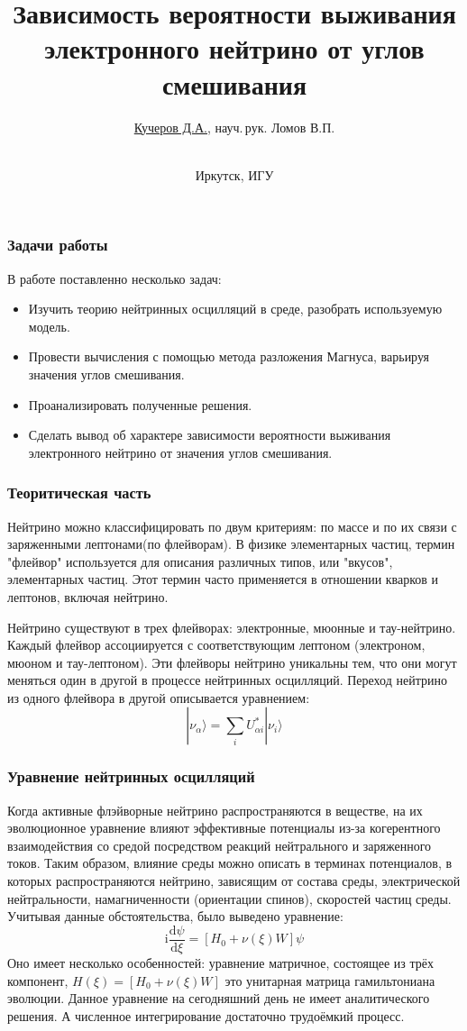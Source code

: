 \documentclass[utf8,9pt,mathserif,usepdftitle=false]{beamer}
\title{Зависимость вероятности выживания электронного нейтрино от углов смешивания}%
\author{\underline{Кучеров Д.А.}, {науч.\,рук. Ломов В.П.}}
\date[ИДСТУ, 2023]{\\[4ex]%
  \small{}Иркутск, ИГУ}
\newcommand{\dd}{\mathrm{d}}
\renewcommand{\imath}{\mathrm{i}}
\begin{document}

\begin{frame}
  \titlepage
\end{frame}

\begin{frame}
	\frametitle{Задачи работы}
  В работе поставленно несколько задач:
  \begin{itemize}
  \item<2-> Изучить теорию нейтринных осцилляций в среде, разобрать используемую модель.
  \item<3-> Провести вычисления с помощью метода разложения Магнуса, варьируя значения углов смешивания.
  \item<4-> Проанализировать полученные решения.
  \item<5-> Сделать вывод об характере зависимости вероятности выживания электронного нейтрино от значения углов смешивания. 
  \end{itemize}
\end{frame}

\begin{frame}
	\frametitle{Теоритическая часть}
	Нейтрино можно классифицировать по двум критериям: по массе и по их связи с заряженными лептонами(по флейворам).
	В физике элементарных частиц, термин "флейвор" используется для описания различных типов, или "вкусов", элементарных частиц. Этот термин часто применяется в отношении кварков и лептонов, включая нейтрино.
	
	Нейтрино существуют в трех флейворах: электронные, мюонные и тау-нейтрино. Каждый флейвор ассоциируется с соответствующим лептоном (электроном, мюоном и тау-лептоном). Эти флейворы нейтрино уникальны тем, что они могут меняться один в другой в процессе нейтринных осцилляций. Переход нейтрино из одного флейвора в другой описывается уравнением:
	\begin{equation}
		|\nu_{\alpha}\rangle=\sum_{i}U_{\alpha i}^{*}|\nu_{i}\rangle
	\end{equation}
\end{frame}

\begin{frame}
	\frametitle{Уравнение нейтринных осцилляций}
	Когда активные флэйворные нейтрино распространяются в веществе, на их эволюционное уравнение влияют эффективные потенциалы из-за когерентного взаимодействия со средой посредством реакций нейтрального и заряженного токов. Таким образом, влияние среды можно описать в терминах потенциалов, в которых распространяются нейтрино, зависящим от состава среды, электрической нейтральности, намагниченности (ориентации спинов), скоростей частиц среды. Учитывая данные обстоятельства, было выведено уравнение:
	\begin{equation}\label{eq:2}
		\imath\frac{\dd\psi}{\dd\xi}=[H_{0}+\nu(\xi)W]\psi
	\end{equation}
	Оно имеет несколько особенностей: уравнение матричное, состоящее из трёх компонент, \(H(\xi)=[H_{0}+\nu(\xi)W]\) это унитарная матрица гамильтониана эволюции.
	Данное уравнение на сегодняшний день не имеет аналитического решения. А численное интегрирование достаточно трудоёмкий процесс.
\end{frame}
\end{document}
